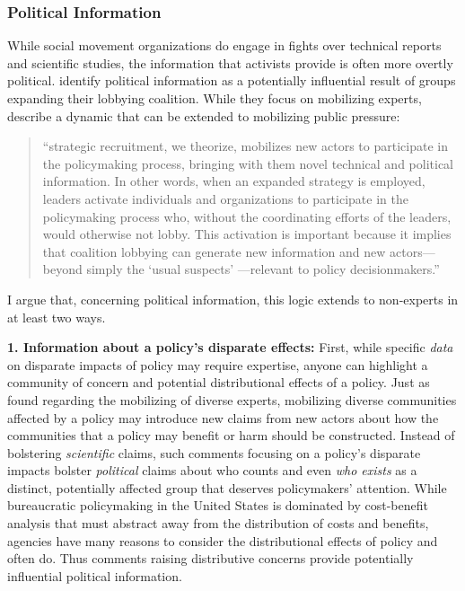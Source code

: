 \documentclass[
      12pt,
        ]{article}
\begin{document}
\hypertarget{political-information}{%
\subsubsection{Political Information}\label{political-information}}

While social movement organizations do engage in fights over technical reports and scientific studies, the information that activists provide is often more overtly political.
\citet{Nelson2012}
identify political information as a potentially influential result of
groups expanding their lobbying coalition. While they focus on
mobilizing experts, \citet{Nelson2012} describe a dynamic that can be extended
to mobilizing public pressure:

\begin{quote}
``strategic recruitment, we theorize, mobilizes new actors to
participate in the policymaking process, bringing with them novel
technical and political information. In other words, when an expanded
strategy is employed, leaders activate individuals and organizations
to participate in the policymaking process who, without the
coordinating efforts of the leaders, would otherwise not lobby. This
activation is important because it implies that coalition lobbying can
generate new information and new actors---beyond simply the `usual
suspects' ---relevant to policy decisionmakers.''
\end{quote}

I argue that, concerning political information, this logic extends to
non-experts in at least two ways.

\textbf{1. Information about a policy's disparate effects:}
First, while specific \emph{data} on disparate impacts of policy may require expertise, anyone can highlight a community of concern and potential distributional effects of a policy. Just as \citet{Nelson2012} found regarding the mobilizing of diverse experts, mobilizing diverse communities affected by a policy may introduce new claims from new actors about how the communities that a policy may benefit or harm should be constructed. Instead of bolstering \emph{scientific} claims, such comments focusing on a policy's disparate impacts bolster \emph{political} claims about who counts and even \emph{who exists} as a distinct, potentially affected group that deserves policymakers' attention. While bureaucratic policymaking in the United States is dominated by cost-benefit analysis that must abstract away from the distribution of costs and benefits, agencies have many reasons to consider the distributional effects of policy and often do.
Thus comments raising distributive concerns provide potentially influential political information.
\end{document}
